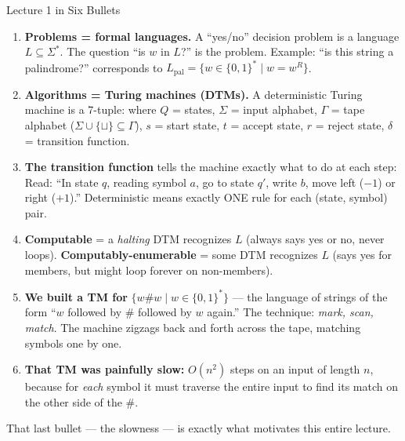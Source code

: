 \begin{notebox}{Lecture 1 in Six Bullets}
\begin{enumerate}[nosep]
\item \textbf{Problems = formal languages.} A ``yes/no'' decision problem is a language $L \subseteq \Sigma^*$. The question ``is $w$ in $L$?'' is the problem. Example: ``is this string a palindrome?'' corresponds to $L_{\text{pal}} = \{w \in \{0,1\}^* \mid w = w^R\}$.

\item \textbf{Algorithms = Turing machines (DTMs).} A deterministic Turing machine is a 7-tuple:
where $Q$ = states, $\Sigma$ = input alphabet, $\Gamma$ = tape alphabet ($\Sigma \cup \{\sqcup\} \subseteq \Gamma$), $s$ = start state, $t$ = accept state, $r$ = reject state, $\delta$ = transition function.

\item \textbf{The transition function} tells the machine exactly what to do at each step:
Read: ``In state $q$, reading symbol $a$, go to state $q'$, write $b$, move left ($-1$) or right ($+1$).'' Deterministic means exactly ONE rule for each (state, symbol) pair.

\item \textbf{Computable} = a \textit{halting} DTM recognizes $L$ (always says yes or no, never loops). \textbf{Computably-enumerable} = some DTM recognizes $L$ (says yes for members, but might loop forever on non-members).

\item \textbf{We built a TM for} $\{w\#w \mid w \in \{0,1\}^*\}$ --- the language of strings of the form ``$w$ followed by \# followed by $w$ again.'' The technique: \textit{mark, scan, match}. The machine zigzags back and forth across the tape, matching symbols one by one.

\item \textbf{That TM was painfully slow:} $O(n^2)$ steps on an input of length $n$, because for \textit{each} symbol it must traverse the entire input to find its match on the other side of the \#.
\end{enumerate}
\end{notebox}

That last bullet --- the slowness --- is exactly what motivates this entire lecture.


